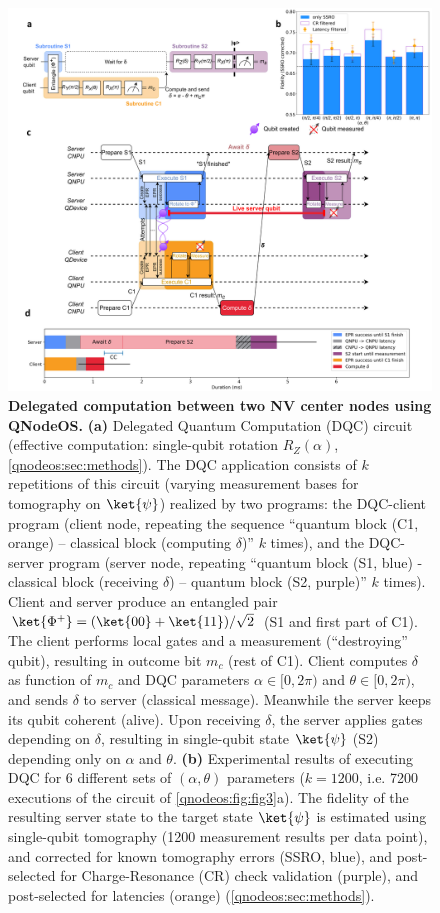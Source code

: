 \begin{figure}[t]
\centering
\includegraphics[width=1.0\textwidth]{figures/qnodeos/main/fig3/fig3.png}
\caption{\textbf{Delegated computation between two NV center nodes using QNodeOS.} 
\textbf{(a)} Delegated Quantum Computation (DQC) circuit (effective computation: single-qubit rotation $R_Z (\alpha)$, \cref{qnodeos:sec:methods}). The DQC application consists of $k$ repetitions of this circuit (varying measurement bases for tomography on $\ket{\psi}$) realized by two programs: the DQC-client program (client node, repeating the sequence ``quantum block (C1, orange) – classical block (computing $\delta$)'' $k$ times), and the DQC-server program (server node, repeating ``quantum block (S1, blue) - classical block (receiving $\delta$) – quantum block (S2, purple)'' $k$ times). Client and server produce an entangled pair $\ket{\Phi^+} = (\ket{00} + \ket{11}) / \sqrt{2}$ (S1 and first part of C1). The client performs local gates and a measurement (``destroying'' qubit), resulting in outcome bit $m_c$ (rest of C1). Client computes $\delta$ as function of $m_c$ and DQC parameters $\alpha \in [0,2\pi)$ and $\theta \in [0, 2\pi)$, and sends $\delta$ to server (classical message). Meanwhile the server keeps its qubit coherent (alive). Upon receiving $\delta$, the server applies gates depending on $\delta$, resulting in single-qubit state $\ket{\psi}$ (S2) depending only on $\alpha$ and $\theta$.
\textbf{(b)} Experimental results of executing DQC for 6 different sets of $(\alpha, \theta)$ parameters ($k=1200$, i.e. 7200 executions of the circuit of \cref{qnodeos:fig:fig3}a). The fidelity of the resulting server state to the target state $\ket{\psi}$ is estimated using single-qubit tomography (1200 measurement results per data point), and corrected for known tomography errors (SSRO, blue), and post-selected for Charge-Resonance (CR) check validation (purple), and post-selected for latencies (orange) (\cref{qnodeos:sec:methods}).
}
\end{figure}
